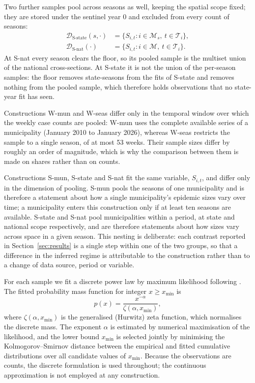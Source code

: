 \documentclass[english,10pt,b5paper]{article}
\newcommand{\lvl}[1]{\mbox{#1}}
\begin{document}
Two further samples pool across seasons as well, keeping the spatial scope
fixed; they are stored under the sentinel year $0$ and excluded from every
count of seasons:
%
\begin{align*}
\mathcal{D}_{\text{S-state}}(s,\cdot) &= \{S_{i,t}: i\in\mathcal{M}_s,\
t\in\mathcal{T}_i\},\\ \mathcal{D}_{\text{S-nat}}(\cdot)     &= \{S_{i,t}:
i\in\mathcal{M},\ t\in\mathcal{T}_i\}.
\end{align*}
%
At \lvl{S-nat} every season clears the floor, so its pooled sample is the
multiset union of the national cross-sections. At \lvl{S-state} it is not the
union of the per-season samples: the floor removes state-seasons from the fits
of \lvl{S-state} and removes nothing from the pooled sample, which therefore
holds observations that no state-year fit has seen.

Constructions \lvl{W-mun} and \lvl{W-seas} differ only in the temporal window
over which the weekly case counts are pooled: \lvl{W-mun} uses the complete
available series of a municipality (January 2010 to January 2026), whereas
\lvl{W-seas} restricts the sample to a single season, of at most 53 weeks.
Their sample sizes differ by roughly an order of magnitude, which is why the
comparison between them is made on shares rather than on counts.

Constructions \lvl{S-mun}, \lvl{S-state} and \lvl{S-nat} fit the same
variable, $S_{i,t}$, and differ only in the dimension of pooling. \lvl{S-mun}
pools the seasons of one municipality and is therefore a statement about how a
single municipality's epidemic sizes vary over time; a municipality enters
this construction only if at least ten seasons are available. \lvl{S-state}
and \lvl{S-nat} pool municipalities within a period, at state and national
scope respectively, and are therefore statements about how sizes vary across
space in a given season. This nesting is deliberate: each contrast reported in
Section~\ref{sec:results} is a single step within one of the two groups, so
that a difference in the inferred regime is attributable to the construction
rather than to a change of data source, period or variable.

For each sample we fit a discrete power law by maximum likelihood following
\citet{clauset2009power}. The fitted probability mass function for integer
$x \ge x_{\min}$ is
%
\begin{equation}
p(x) = \frac{x^{-\alpha}}{\zeta(\alpha, x_{\min})},
\label{eq:pl}
\end{equation}
%
where $\zeta(\alpha, x_{\min})$ is the generalised (Hurwitz) zeta function, which
normalises the discrete mass. The exponent $\alpha$ is estimated by numerical
maximisation of the likelihood, and the lower bound $x_{\min}$ is selected
jointly by minimising the Kolmogorov--Smirnov distance between the empirical and
fitted cumulative distributions over all candidate values of $x_{\min}$. Because
the observations are counts, the discrete formulation is used throughout; the
continuous approximation is not employed at any construction.
\end{document}
